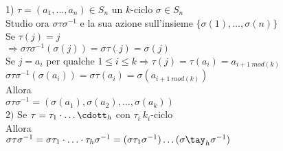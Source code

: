 \documentclass[12px]{article}
\begin{document}
	  \begin{dimo}
	  	1) $\tau = (a_1,\ldots, a_n)\in S_n$ un $k$-ciclo $\sigma \in S_n$\\
		Studio ora  $\sigma \tau\sigma^{-1}$ e la sua azione sull'insieme  $\{\sigma(1),\ldots, \sigma(n)\}$\\
		Se  $\tau(j) = j$\\
		$ \Rightarrow \sigma \tau \sigma^{-1}(\sigma(j)) = \sigma\tau(j) = \sigma (j)$ \\
		Se $j = a_i$ per qualche $1\leq i\leq k \Rightarrow \tau (j) = \tau (a_i) = a_{i + 1 \ mod(k)}$ \\
		$\sigma\tau\sigma^{-1}(\sigma(a_i)) = \sigma\tau(a_i) = \sigma (a_{i + 1 \ mod(k)})$\\
		Allora \\
		$\sigma\tau\sigma^{-1} = (\sigma(a_1),\sigma(a_2),\ldots, \sigma(a_k))$\\
		$2)$ Se $\tau = \tau_1\cdot\ldots\cdott_h$ con $\tau_i \ k_i$-ciclo\\
		Allora\\
		$\sigma\tau\sigma^{-1} = \sigma\tau_1\cdot\ldots\cdot\tau_h\sigma^{-1} = (\sigma\tau_1\sigma^{-1})\ldots(\sigma\tay_h\sigma^{-1})$
	  \end{dimo}
\end{document}
